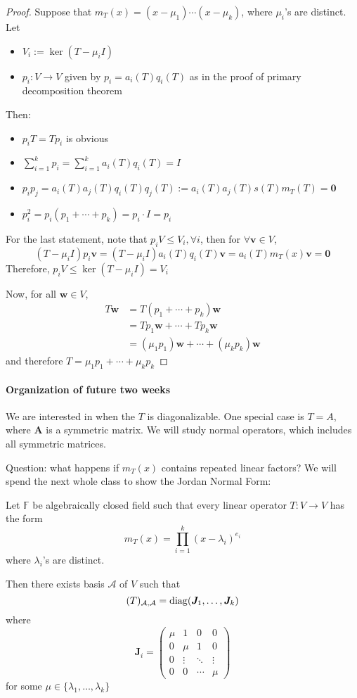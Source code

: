 \begin{proof}
Suppose that $m_T(x) = (x-\mu_1)\cdots(x-\mu_k)$, where $\mu_i$'s are distinct.
Let
\begin{itemize}
\item
$V_i:=\ker(T-\mu_iI)$
\item
$p_i:V\to V$ given by $p_i=a_i(T)q_i(T)$ as in the proof of primary decomposition theorem
\end{itemize}
Then:
\begin{itemize}
\item
$p_iT=Tp_i$ is obvious
\item
$\sum_{i=1}^kp_i=\sum_{i=1}^ka_i(T)q_i(T)=I$
\item
$p_ip_j = a_i(T)a_j(T)q_i(T)q_j(T):=a_i(T)a_j(T)s(T)m_T(T)=\bm0$
\item
$p_i^2 = p_i(p_1+\cdots+p_k) = p_i\cdot I=p_i$
\end{itemize}

For the last statement, note that $p_iV\le V_i,\forall i$, then for $\forall\bm v\in V$,
\[
(T-\mu_iI)p_i\bm v=(T-\mu_iI)a_i(T)q_i(T)\bm v
=
a_i(T)m_T(x)\bm v=\bm0
\]
Therefore, $p_iV\le\ker(T-\mu_i I)=V_i$

Now, for all $\bm w\in V$, 
\begin{align*}
T\bm w&=T(p_1+\cdots+p_k)\bm w\\
&=Tp_1\bm w+\cdots+Tp_k\bm w\\
&=(\mu_1p_1)\bm w+\cdots+(\mu_kp_k)\bm w
\end{align*}
and therefore $T = \mu_1p_1+\cdots+\mu_kp_k$
\end{proof}

\paragraph{Organization of future two weeks}
We are interested in when the $T$ is diagonalizable.
One special case is $T=A$, where $\bm A$ is a symmetric matrix.
We will study normal operators, which includes all symmetric matrices.

Question: what happens if $m_T(x)$ contains repeated linear factors?
We will spend the next whole class to show the Jordan Normal Form:
\begin{theorem}
Let $\mathbb{F}$ be algebraically closed field such that every linear operator $T:V\to V$ has the form
\[
m_T(x) = \prod_{i=1}^k(x-\lambda_i)^{e_i}
\]
where $\lambda_i$'s are distinct.

Then there exists basis $\mathcal{A}$ of $V$ such that
\[
(T)_{\mathcal{A},\mathcal{A}}
=
\operatorname{diag}(\bm J_1,\dots,\bm J_k)
\]
where
\[
\bm J_i=\begin{pmatrix}
\mu&1&0&0\\
0&\mu&1&0\\
0&\vdots&\ddots&\vdots\\
0&0&\cdots&\mu
\end{pmatrix}
\]
for some $\mu\in\{\lambda_1,\dots,\lambda_k\}$
\end{theorem}










